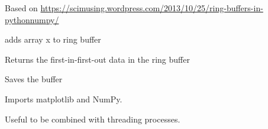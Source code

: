 \documentclass[letterpaper,10pt,english]{sphinxmanual}
\begin{document}
\begin{fulllineitems}
\label{\detokenize{code:mainGUI.RingBuffer}}
Based on \url{https://scimusing.wordpress.com/2013/10/25/ring-buffers-in-pythonnumpy/}

\begin{fulllineitems}
\label{\detokenize{code:mainGUI.RingBuffer.extend}}
adds array x to ring buffer

\end{fulllineitems}


\begin{fulllineitems}
\label{\detokenize{code:mainGUI.RingBuffer.get}}
Returns the first-in-first-out data in the ring buffer

\end{fulllineitems}


\begin{fulllineitems}
\label{\detokenize{code:mainGUI.RingBuffer.save}}
Saves the buffer

\end{fulllineitems}


\end{fulllineitems}


\begin{fulllineitems}
\label{\detokenize{code:mainGUI.heavy_import}}
Imports matplotlib and NumPy.

Useful to be combined with threading processes.

\end{fulllineitems}

\end{document}
